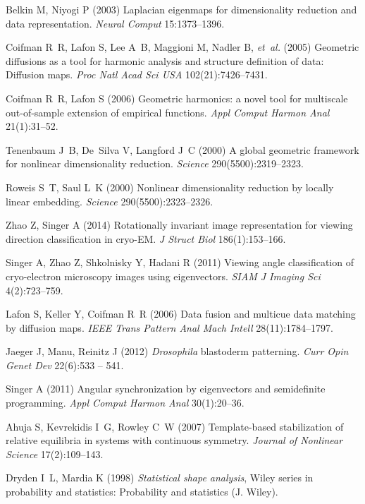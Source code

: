 \documentclass{pnastwo}
\begin{document}
\begin{article}
\begin{thebibliography}{10}
Belkin M, Niyogi P (2003) Laplacian eigenmaps for dimensionality reduction and
  data representation. \textit{Neural Comput} 15:1373--1396.

Coifman R~R, Lafon S, Lee A~B, Maggioni M, Nadler B, \textit{et~al.} (2005)
  Geometric diffusions as a tool for harmonic analysis and structure definition
  of data: Diffusion maps. \textit{Proc Natl Acad Sci USA} 102(21):7426--7431.

Coifman R~R, Lafon S (2006) Geometric harmonics: a novel tool for multiscale
  out-of-sample extension of empirical functions. \textit{Appl Comput Harmon Anal} 21(1):31--52.

Tenenbaum J~B, De~Silva V, Langford J~C (2000) A global geometric framework for
  nonlinear dimensionality reduction. \textit{Science} 290(5500):2319--2323.

Roweis S~T, Saul L~K (2000) Nonlinear dimensionality reduction by locally
  linear embedding. \textit{Science} 290(5500):2323--2326.

Zhao Z, Singer A (2014) Rotationally invariant image representation for
viewing direction classification in cryo-EM. \textit{J Struct Biol} 186(1):153--166.

Singer A, Zhao Z, Shkolnisky Y, Hadani R (2011) Viewing angle
classification of cryo-electron microscopy images using eigenvectors. \textit{SIAM J Imaging Sci} 4(2):723--759.

Lafon S, Keller Y, Coifman R~R (2006) 
Data fusion and multicue data matching by diffusion maps. \textit{IEEE Trans Pattern Anal Mach Intell}
28(11):1784--1797.

Jaeger J, Manu, Reinitz J (2012) \textit{{D}rosophila} blastoderm patterning.
  \textit{Curr Opin Genet Dev} 22(6):533 -- 541.

Singer A (2011) Angular synchronization by eigenvectors and semidefinite
  programming. \textit{Appl Comput Harmon Anal}
  30(1):20--36.

Ahuja S, Kevrekidis I~G, Rowley C~W (2007) Template-based stabilization of
  relative equilibria in systems with continuous symmetry. \textit{Journal of
  Nonlinear Science} 17(2):109--143.

Dryden I~L, Mardia K (1998) \textit{Statistical shape analysis}, Wiley series
  in probability and statistics: Probability and statistics (J. Wiley).


\end{thebibliography}
\end{article}
\end{document}

